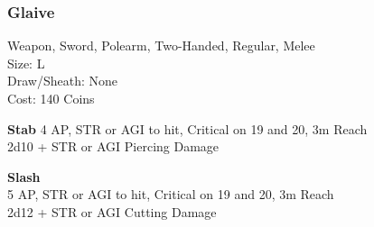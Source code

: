 \subsubsection{Glaive}\label{weapon:glaive}
Weapon, Sword, Polearm, Two-Handed, Regular, Melee\\
Size: L\\
Draw/Sheath: None\\
Cost: 140 Coins

\textbf{Stab}
4 AP, STR or AGI to hit, Critical on 19 and 20, 3m Reach\\
2d10 + \texttimes STR or AGI Piercing Damage

\textbf{Slash}\\
5 AP, STR or AGI to hit, Critical on 19 and 20, 3m Reach\\
2d12 + \texttimes STR or AGI Cutting Damage

